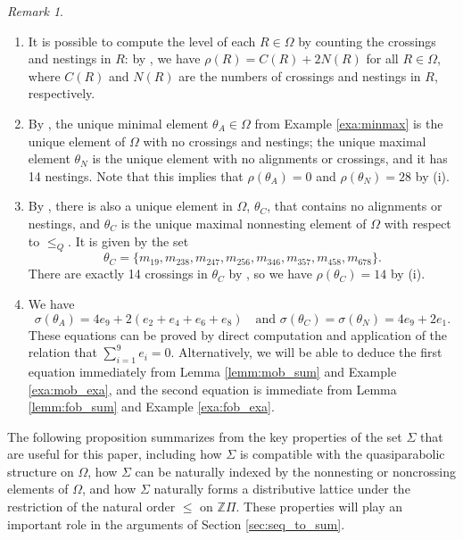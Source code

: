 \documentclass[11pt]{amsart}
\theoremstyle{plain}
\theoremstyle{definition}
\theoremstyle{remark}
\newtheorem{rmk}[theorem]{Remark}
\numberwithin{equation}{section}
\newcommand{\Z}{{\mathbb Z}}
\newcommand{\ob}{\Omega}
\begin{document}
\begin{rmk}
\label{rmk:theta_C}
\begin{enumerate}
\item It is possible to compute the level of each $R\in \ob$ by counting the
  crossings and nestings in $R$: by \cite[Corollary 4.2]{gx6}, we have
  $\rho(R)=C(R)+2N(R)$ for all $R\in \ob$, where $C(R)$ and $N(R)$ are the
  numbers of crossings and nestings in $R$, respectively.
\item By \cite[Proposition 4.11, Proposition 6.9]{gx5}, the unique minimal
  element $\theta_A\in \ob$ from Example \ref{exa:minmax} is the unique element
  of $\ob$ with no crossings and nestings; the unique maximal element $\theta_N$
  is the unique element with no alignments or crossings, and it has 14 nestings.
  Note that this implies that $\rho(\theta_A)=0$ and $\rho(\theta_N)=28$ by (i). 
\item By \cite[Proposition 5.2 (iii), Proposition 6.9]{gx5}, there is also a
  unique element in $\ob$, $\theta_C$, that contains no
  alignments or nestings, and $\theta_C$ is the unique maximal nonnesting
  element of $\ob$ with respect to $\le_Q$. It is given by the set
\begin{equation*}
\label{eq:theta_C}
\theta_C=\{m_{19}, m_{238}, m_{247}, m_{256}, m_{346}, m_{357}, m_{458}, m_{678}\}.
\end{equation*}
There are exactly 14 crossings in $\theta_C$ by \cite[Corollary 3.19]{gx5}, so
we have $\rho(\theta_C)=14$ by (i). 

\item We have 
  \begin{equation}
  \label{eq:theta_sums}
  \sigma(\theta_A)=4e_9+2(e_2+e_4+e_6+e_8) \quad \text{and }
  \sigma(\theta_C)=\sigma(\theta_N)=4e_9+2e_1.
  \end{equation}
These equations can be proved by direct computation and application of the
relation that $\sum_{i=1}^9e_i=0$. Alternatively, we will be able to deduce the
first equation immediately from Lemma \ref{lemm:mob_sum} and Example
\ref{exa:mob_exa}, and the second equation is immediate from Lemma
\ref{lemm:fob_sum} and Example \ref{exa:fob_exa}.  
\end{enumerate}
\end{rmk}

The following proposition summarizes from \cite{gx5} the key properties of the
set $\Sigma$ that are useful for this paper, including how $\Sigma$ is compatible
with the quasiparabolic structure on $\ob$, how $\Sigma$ can be naturally
indexed by the nonnesting or noncrossing elements of $\ob$, and how $\Sigma$
naturally forms a distributive lattice under the restriction of the
natural order $\le$ on $\Z\Pi$. 
These properties will play an important
role in the arguments of Section \ref{sec:seq_to_sum}.
\end{document}
